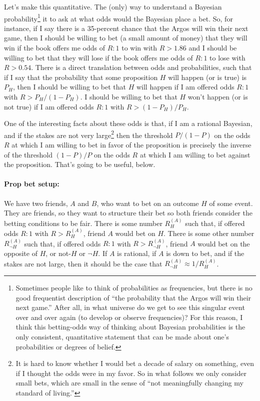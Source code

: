 \documentclass{article}
\renewcommand{\not}{\neg}
\begin{document}
Let's make this quantitative.
The (only) way to understand a Bayesian probability\footnote{%
Sometimes people like to think of probabilities as frequencies, but there is no good frequentist description
of ``the probability that the Argos will win their next game.''
After all, in what universe do we get to see this singular event over and over again (to develop or observe frequencies)?
For this reason, I think this betting-odds way of thinking about Bayesian probabilities is the only consistent,
quantitative statement that can be made about one's probabilities or degrees of belief.}
it to ask at what odds would the Bayesian place a bet.
So, for instance, if I say there is a 35-percent chance that the Argos will win their next game,
then I should be willing to bet (a small amount of money) that they will win if the book offers me odds
of $R:1$ to win with $R>1.86$
and I should be willing to bet that they will lose if the book offers
me odds of $R:1$ to lose with $R>0.54$.
There is a direct translation between odds and probabilities, such that if I say that the probability
that some proposition $H$ will happen (or is true) is $P_H$, then I should be willing to bet that $H$
will happen if I am offered odds $R:1$ with $R>P_H/(1 - P_H)$.
I should be willing to bet that $H$ won't happen (or is not true) if I am offered odds $R:1$ with $R>(1-P_H)/P_H$.

One of the interesting facts about these odds is that, if I am a rational Bayesian,
and if the stakes are not very large\footnote{%
It is hard to know whether I would bet a decade of salary on something, even if I thought the odds were in my favor.
So in what follows we only consider small bets, which are small in the sense of ``not meaningfully changing my standard of living.''}
then the threshold $P/(1-P)$ on the odds $R$ at which I am willing to bet in favor of the proposition is
precisely the inverse of the threshold $(1-P)/P$ on the odds $R$ at which I am willing to bet against the proposition.
That's going to be useful, below.

\paragraph{Prop bet setup:}
We have two friends, $A$ and $B$, who want to bet on an outcome $H$ of some event.
They are friends, so they want to structure their bet so both friends consider the betting conditions to be fair.
There is some number $R_H^{(A)}$ such that, if offered odds $R:1$ with $R>R_H^{(A)}$, friend $A$ would bet on $H$.
There is some other number $R_{\not H}^{(A)}$ such that, if offered odds $R:1$ with $R>R_{\not H}^{(A)}$, friend $A$
would bet on the opposite of $H$, or not-$H$ or $\not H$.
If $A$ is rational, if $A$ is down to bet, and if the stakes are not large, then it should be the case that
$R_{\not H}^{(A)} \approx 1/R_H^{(A)}$.
\end{document}
